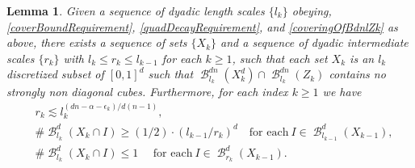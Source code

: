 \documentclass[dvipsnames,letterpaper,12pt]{article}
\numberwithin{equation}{section}
\theoremstyle{plain}
\newtheorem{lemma}{Lemma}
\theoremstyle{remark}
\DeclareMathOperator{\B}{\mathcal{B}}
\begin{document}
\begin{lemma} 
	Given a sequence of dyadic length scales $\{l_k\}$ obeying, \eqref{coverBoundRequirement}, \eqref{quadDecayRequirement}, and \eqref{coveringOfBdnlZk} as above, there exists a sequence of sets $\{X_k\}$ and a sequence of dyadic intermediate scales $\{ r_k \}$ with $l_k \leq r_k \leq l_{k-1}$ for each $k \geq 1$, such that each set $X_k$ is an $l_k$ discretized subset of $[0,1]^d$ such that $\B^{dn}_{l_k}(X_k^d) \cap \B^{dn}_{l_k}(Z_k)$ contains no strongly non diagonal cubes. Furthermore, for each index $k\geq 1$ we have
	\begin{align}
		& r_k \lesssim l_k^{(dn-\alpha -\epsilon_k)/d(n-1)},\label{rkSizeBound}\\
		& \# \B^d_{l_k}(X_k \cap I) \geq (1/2) \cdot (l_{k-1}/r_k)^d \quad \text{for each}\ I\in \B_{l_{k-1}}^d(X_{k-1}), \label{manyIkInIkm1}\\
		&\# \B^d_{l_k}(X_k \cap I) \leq 1 \quad \text{ for each}\ I \in \B_{r_{k}}^d(X_{k-1}).\label{XkWellDistributed}
	\end{align}
\end{lemma}
\end{document}
